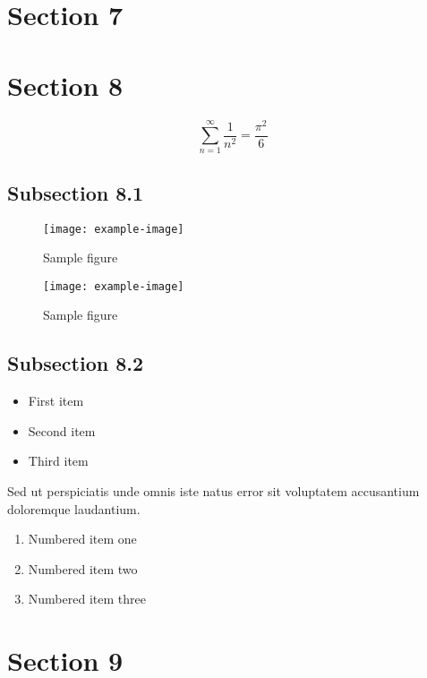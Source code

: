 \documentclass{article}
\begin{document}
\section{Section 7}

\section{Section 8}

\begin{equation}
    \sum_{n=1}^{\infty} \frac{1}{n^2} = \frac{\pi^2}{6}
\end{equation}

\subsection{Subsection 8.1}

\begin{figure}[h]
    \centering
    \texttt{[image: example-image]}
    \caption{Sample figure}
    \label{fig:sample}
\end{figure}

\begin{figure}[h]
    \centering
    \texttt{[image: example-image]}
    \caption{Sample figure}
    \label{fig:sample}
\end{figure}

\subsection{Subsection 8.2}

\begin{itemize}
\item First item
\item Second item
\item Third item
\end{itemize}

Sed ut perspiciatis unde omnis iste natus error sit voluptatem accusantium doloremque laudantium.

\begin{enumerate}
\item Numbered item one
\item Numbered item two
\item Numbered item three
\end{enumerate}

\section{Section 9}
\end{document}
